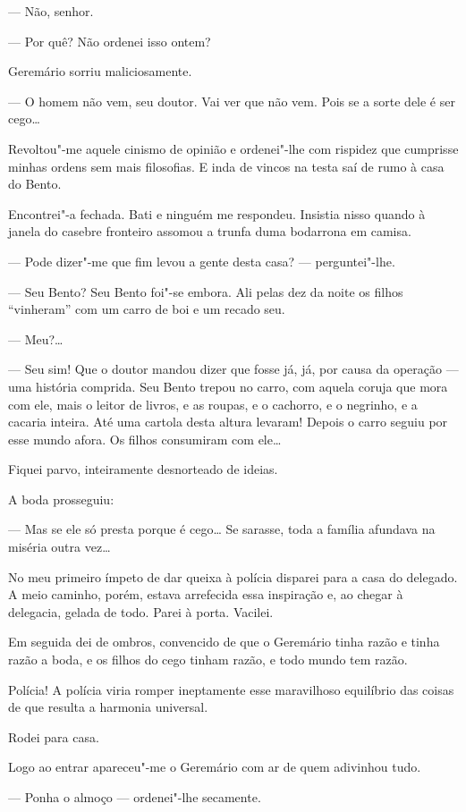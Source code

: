 --- Não, senhor.

--- Por quê? Não ordenei isso ontem?

Geremário sorriu maliciosamente.

--- O homem não vem, seu doutor. Vai ver que não vem. Pois se a sorte
dele é ser cego\ldots{}

Revoltou"-me aquele cinismo de opinião e ordenei"-lhe com rispidez que
cumprisse minhas ordens sem mais filosofias. E inda de vincos na testa
saí de rumo à casa do Bento.

Encontrei"-a fechada. Bati e ninguém me respondeu. Insistia nisso quando
à janela do casebre fronteiro assomou a trunfa duma bodarrona em camisa.

--- Pode dizer"-me que fim levou a gente desta casa? --- perguntei"-lhe.

--- Seu Bento? Seu Bento foi"-se embora. Ali pelas dez da noite os filhos
``vinheram'' com um carro de boi e um recado seu.

--- Meu?\ldots{}

--- Seu sim! Que o doutor mandou dizer que fosse já, já, por causa da
operação --- uma história comprida. Seu Bento trepou no carro, com
aquela coruja que mora com ele, mais o leitor de livros, e as roupas, e
o cachorro, e o negrinho, e a cacaria inteira. Até uma cartola desta
altura levaram! Depois o carro seguiu por esse mundo afora. Os filhos
consumiram com ele\ldots{}

Fiquei parvo, inteiramente desnorteado de ideias.

A boda prosseguiu:

--- Mas se ele só presta porque é cego\ldots{} Se sarasse, toda a família
afundava na miséria outra vez\ldots{}

No meu primeiro ímpeto de dar queixa à polícia disparei para a casa do
delegado. A meio caminho, porém, estava arrefecida essa inspiração e, ao
chegar à delegacia, gelada de todo. Parei à porta. Vacilei.

Em seguida dei de ombros, convencido de que o Geremário tinha razão e
tinha razão a boda, e os filhos do cego tinham razão, e todo mundo tem
razão.

Polícia! A polícia viria romper ineptamente esse maravilhoso equilíbrio
das coisas de que resulta a harmonia universal.

Rodei para casa.

Logo ao entrar apareceu"-me o Geremário com ar de quem adivinhou tudo.

--- Ponha o almoço --- ordenei"-lhe secamente.

